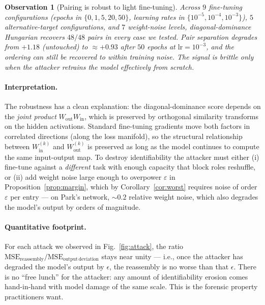 \documentclass[10pt]{article}
\newtheorem{observation}{Observation}
\theoremstyle{remark}
\begin{document}
\begin{observation}[Pairing is robust to light fine-tuning]\label{obs:attack}
Across $9$ fine-tuning configurations (epochs in $\{0,1,5,20,50\}$,
learning rates in $\{10^{-5}, 10^{-4}, 10^{-3}\}$), $5$ alternative-target
configurations, and $7$ weight-noise levels, diagonal-dominance
Hungarian recovers \emph{$48/48$ pairs in every case we tested}.
Pair separation degrades from $+1.18$ (untouched) to $\approx+0.93$
after $50$ epochs at $\mathrm{lr}=10^{-3}$, and the ordering can
still be recovered to within training noise. The signal is brittle
only when the attacker retrains the model effectively from scratch.
\end{observation}

\paragraph{Interpretation.} The robustness has a clean explanation:
the diagonal-dominance score depends on the \emph{joint product}
$W_{\mathrm{out}} W_{\mathrm{in}}$, which is preserved by orthogonal
similarity transforms on the hidden activations. Standard fine-tuning
gradients move both factors in correlated directions (along the loss
manifold), so the structural relationship between $W_{\mathrm{in}}^{(k)}$
and $W_{\mathrm{out}}^{(k)}$ is preserved as long as the model
continues to compute the same input-output map. To destroy
identifiability the attacker must either (i) fine-tune against a
\emph{different} task with enough capacity that block roles reshuffle,
or (ii) add weight noise large enough to overpower
$\varepsilon$ in Proposition~\ref{prop:margin}, which by
Corollary~\ref{cor:worst} requires noise of order $\varepsilon$ per
entry --- on Park's network, $\sim 0.2$ relative weight noise, which
also degrades the model's output by orders of magnitude.

\paragraph{Quantitative footprint.} For each attack we observed in
Fig.~\ref{fig:attack}, the ratio
$\mathrm{MSE_{reassembly}} / \mathrm{MSE_{output\,deviation}}$ stays
near unity --- i.e., once the attacker has degraded the model's
output by $\epsilon$, the reassembly is no worse than that
$\epsilon$. There is no ``free lunch'' for the attacker: any amount
of identifiability erosion comes hand-in-hand with model damage of
the same scale. This is the forensic property practitioners want.
\end{document}
